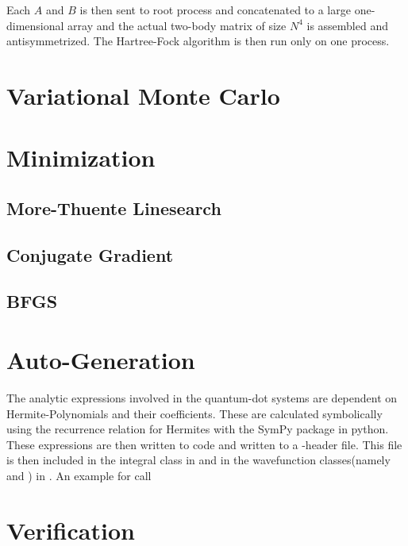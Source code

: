     Each $A$ and $B$ is then sent to root process and concatenated to a large
    one-dimensional array and the actual two-body matrix of size $N^4$ is
    assembled and antisymmetrized. The Hartree-Fock algorithm is then run only
    on one process.

\section{Variational Monte Carlo}
\section{Minimization}
\subsection{More-Thuente Linesearch}
\subsection{Conjugate Gradient}
\subsection{BFGS}
\section{Auto-Generation\label{sec:auto_generation}}
    The analytic expressions involved in the quantum-dot systems are dependent
    on Hermite-Polynomials and their coefficients. These are calculated
    symbolically using the recurrence relation for Hermites with the SymPy
    package in python. These expressions are then written to \CC code and
    written to a \CC-header file. This file is then included in the integral
    class in  and in the wavefunction
    classes(namely  and ) in
    . An example for call
\section{Verification\label{sec:verification}}
